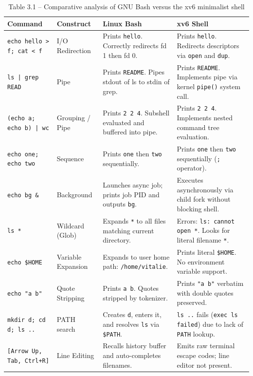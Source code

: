 \documentclass[12pt,a4paper]{report}
\numberwithin{equation}{chapter}
\numberwithin{figure}{chapter}
\numberwithin{table}{chapter}
\begin{document}
\begin{table}[H]
\centering
\small
\begin{tabular}{p{4.2cm}p{2.5cm}p{4.5cm}p{4.5cm}}
\toprule
\textbf{Command} & \textbf{Construct} & \textbf{Linux Bash} & \textbf{xv6 Shell} \\
\midrule
\texttt{echo hello > f; cat < f} & I/O Redirection & Prints \texttt{hello}. Correctly redirects fd 1 then fd 0. & Prints \texttt{hello}. Redirects descriptors via \texttt{open} and \texttt{dup}. \\
\midrule
\texttt{ls | grep READ} & Pipe & Prints \texttt{README}. Pipes stdout of ls to stdin of grep. & Prints \texttt{README}. Implements pipe via kernel \texttt{pipe()} system call. \\
\midrule
\texttt{(echo a; echo b) | wc} & Grouping / Pipe & Prints \texttt{2 2 4}. Subshell evaluated and buffered into pipe. & Prints \texttt{2 2 4}. Implements nested command tree evaluation. \\
\midrule
\texttt{echo one; echo two} & Sequence & Prints \texttt{one} then \texttt{two} sequentially. & Prints \texttt{one} then \texttt{two} sequentially (\texttt{;} operator). \\
\midrule
\texttt{echo bg \&} & Background & Launches async job; prints job PID and outputs \texttt{bg}. & Executes asynchronously via child fork without blocking shell. \\
\midrule
\texttt{ls *} & Wildcard (Glob) & Expands \texttt{*} to all files matching current directory. & Errors: \texttt{ls: cannot open *}. Looks for literal filename \texttt{*}. \\
\midrule
\texttt{echo \$HOME} & Variable Expansion & Expands to user home path: \texttt{/home/vitalie}. & Prints literal \texttt{\$HOME}. No environment variable support. \\
\midrule
\texttt{echo "a b"} & Quote Stripping & Prints \texttt{a b}. Quotes stripped by tokenizer. & Prints \texttt{"a b"} verbatim with double quotes preserved. \\
\midrule
\texttt{mkdir d; cd d; ls ..} & PATH search & Creates \texttt{d}, enters it, and resolves \texttt{ls} via \texttt{\$PATH}. & \texttt{ls ..} fails (\texttt{exec ls failed}) due to lack of \texttt{PATH} lookup. \\
\midrule
\texttt{[Arrow Up, Tab, Ctrl+R]} & Line Editing & Recalls history buffer and auto-completes filenames. & Emits raw terminal escape codes; line editor not present. \\
\bottomrule
\end{tabular}
\caption{Table 3.1 -- Comparative analysis of GNU Bash versus the xv6 minimalist shell}
\label{tab:shell_comp}
\end{table}
\end{document}
